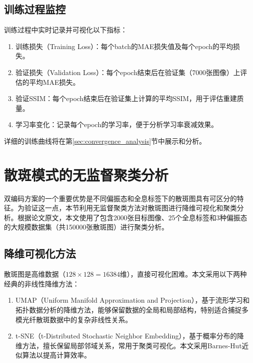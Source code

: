 {\subsection{训练过程监控}\label{sec:training_monitoring}

训练过程中实时记录并可视化以下指标：
\begin{enumerate}
    \item 训练损失（Training Loss）：每个batch的MAE损失值及每个epoch的平均损失。
    
    \item 验证损失（Validation Loss）：每个epoch结束后在验证集（7000张图像）上评估的平均MAE损失。
    
    \item 验证SSIM：每个epoch结束后在验证集上计算的平均SSIM，用于评估重建质量。
    
    \item 学习率变化：记录每个epoch的学习率，便于分析学习率衰减效果。
\end{enumerate}

详细的训练曲线将在第\ref{sec:convergence_analysis}节中展示和分析。


\section{散斑模式的无监督聚类分析}\label{sec:clustering_analysis}

双编码方案的一个重要优势是不同偏振态和全息标签下的散斑图具有可区分的特征。为验证这一点，本节利用无监督聚类方法对散斑图进行降维可视化和聚类分析。根据论文原文，本文使用了包含2000张目标图像、25个全息标签和3种偏振态的大规模数据集（共150000张散斑图）进行聚类分析。

\subsection{降维可视化方法}\label{sec:dimensionality_reduction}

散斑图是高维数据（$128\times128 = 16384$维），直接可视化困难。本文采用以下两种经典的非线性降维方法：
\begin{enumerate}
    \item UMAP（Uniform Manifold Approximation and Projection），基于流形学习和拓扑数据分析的降维方法，能够保留数据的全局和局部结构，特别适合捕捉多模光纤散斑数据中的复杂非线性关系。
    
    \item t-SNE（t-Distributed Stochastic Neighbor Embedding），基于概率分布的降维方法，擅长保留局部邻域关系，常用于聚类可视化。本文采用Barnes-Hut近似算法以提高计算效率。
\end{enumerate}

}
